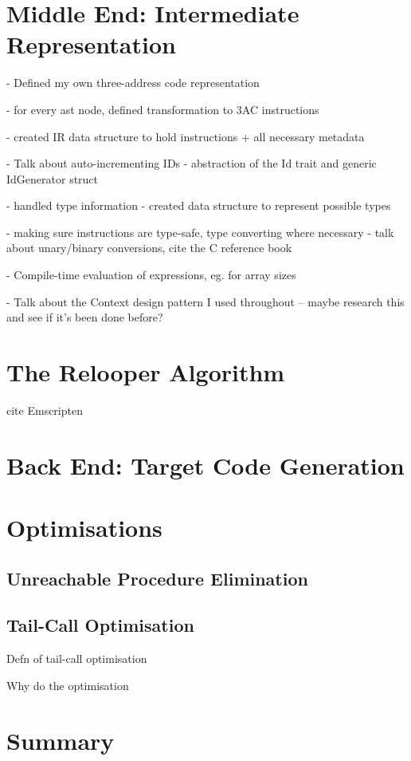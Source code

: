 \documentclass[00-main.tex]{subfiles}
\begin{document}
\section{Middle End: Intermediate Representation}

\begin{Comment}
- Defined my own three-address code representation

- for every ast node, defined transformation to 3AC instructions

- created IR data structure to hold instructions + all necessary metadata

- Talk about auto-incrementing IDs - abstraction of the Id trait and generic IdGenerator struct

- handled type information - created data structure to represent possible types

- making sure instructions are type-safe, type converting where necessary - talk about unary/binary conversions, cite the C reference book

- Compile-time evaluation of expressions, eg. for array sizes

- Talk about the Context design pattern I used throughout -- maybe research this and see if it's been done before?
\end{Comment}

\section{The Relooper Algorithm}

\begin{Comment}
cite Emscripten \cite{emscripten}
\end{Comment}

\section{Back End: Target Code Generation}


\section{Optimisations}

\subsection{Unreachable Procedure Elimination}

\subsection{Tail-Call Optimisation}

\begin{Comment}
Defn of tail-call optimisation

Why do the optimisation
\end{Comment}

\section{Summary}
\end{document}
